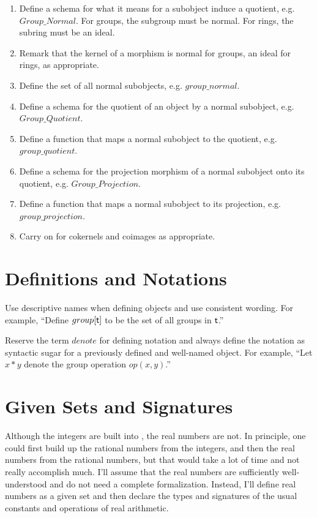 \documentclass{amsart}
\begin{document}
\begin{enumerate}
	\item Define a schema for what it means for a subobject induce a quotient, e.g. $Group\_Normal$.
	For groups, the subgroup must be normal. For rings, the subring must be an ideal.
	\item Remark that the kernel of a morphism is normal for groups, an ideal for rings, as appropriate.
	\item Define the set of all normal subobjects, e.g. $group\_normal$.
	\item Define a schema for the quotient of an object by a normal subobject, e.g. $Group\_Quotient$.
	\item Define a function that maps a normal subobject to the quotient, e.g. $group\_quotient$.
	\item Define a schema for the projection morphism of a normal subobject onto its quotient, 
	e.g. $Group\_Projection$.
	\item Define a function that maps a normal subobject to its projection, e.g. $group\_projection$.
	\item Carry on for cokernels and coimages as appropriate.
\end{enumerate}


\section{Definitions and Notations}

Use descriptive names when defining objects and use consistent wording.
For example, ``Define $group[\mathsf{t}]$ to be the set of all groups in $\mathsf{t}$.''

Reserve the term $denote$ for defining notation and always define the notation
as syntactic sugar for a previously defined and well-named object.
For example, ``Let $x * y$ denote the group operation $op(x,y)$.''

\section{Given Sets and Signatures}

Although the integers are built into \ZN, the real numbers are not.
In principle, one could first build up the rational numbers from the integers,
and then the real numbers from the rational numbers, but that would take a lot of time and not really
accomplish much.
I'll assume that the real numbers are sufficiently well-understood and do not need a complete formalization.
Instead, I'll define real numbers as a given set and then declare the types and signatures of the usual constants and operations of real arithmetic.
\end{document}
